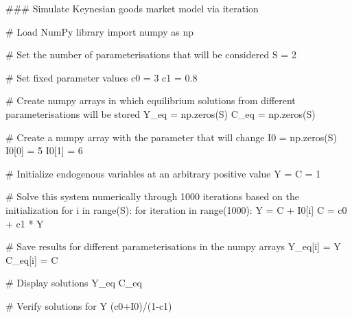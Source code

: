 \documentclass[
  letterpaper,
  DIV=11,
  numbers=noendperiod]{scrreprt}
\newenvironment{Shaded}{\begin{snugshade}}{\end{snugshade}}
\newcommand{\BuiltInTok}[1]{\textcolor[rgb]{0.00,0.23,0.31}{#1}}
\newcommand{\CommentTok}[1]{\textcolor[rgb]{0.37,0.37,0.37}{#1}}
\newcommand{\ControlFlowTok}[1]{\textcolor[rgb]{0.00,0.23,0.31}{#1}}
\newcommand{\DecValTok}[1]{\textcolor[rgb]{0.68,0.00,0.00}{#1}}
\newcommand{\FloatTok}[1]{\textcolor[rgb]{0.68,0.00,0.00}{#1}}
\newcommand{\ImportTok}[1]{\textcolor[rgb]{0.00,0.46,0.62}{#1}}
\newcommand{\KeywordTok}[1]{\textcolor[rgb]{0.00,0.23,0.31}{#1}}
\newcommand{\NormalTok}[1]{\textcolor[rgb]{0.00,0.23,0.31}{#1}}
\newcommand{\OperatorTok}[1]{\textcolor[rgb]{0.37,0.37,0.37}{#1}}
\begin{document}
\begin{tcolorbox}[enhanced jigsaw, titlerule=0mm, breakable, bottomrule=.15mm, toprule=.15mm, colbacktitle=quarto-callout-note-color!10!white, rightrule=.15mm, toptitle=1mm, opacityback=0, left=2mm, coltitle=black, title=\textcolor{quarto-callout-note-color}{\faInfo}\hspace{0.5em}{Python code}, colframe=quarto-callout-note-color-frame, opacitybacktitle=0.6, leftrule=.75mm, bottomtitle=1mm, arc=.35mm, colback=white]

\begin{Shaded}
\begin{Highlighting}[]
\CommentTok{\#\#\# Simulate Keynesian goods market model via iteration}

\CommentTok{\# Load NumPy library}
\ImportTok{import}\NormalTok{ numpy }\ImportTok{as}\NormalTok{ np}

\CommentTok{\# Set the number of parameterisations that will be considered}
\NormalTok{S }\OperatorTok{=} \DecValTok{2}

\CommentTok{\# Set fixed parameter values}
\NormalTok{c0 }\OperatorTok{=} \DecValTok{3}
\NormalTok{c1 }\OperatorTok{=} \FloatTok{0.8}

\CommentTok{\# Create numpy arrays in which equilibrium solutions from different parameterisations will be stored}
\NormalTok{Y\_eq }\OperatorTok{=}\NormalTok{ np.zeros(S)}
\NormalTok{C\_eq }\OperatorTok{=}\NormalTok{ np.zeros(S)}

\CommentTok{\# Create a numpy array with the parameter that will change}
\NormalTok{I0 }\OperatorTok{=}\NormalTok{ np.zeros(S)}
\NormalTok{I0[}\DecValTok{0}\NormalTok{] }\OperatorTok{=} \DecValTok{5}
\NormalTok{I0[}\DecValTok{1}\NormalTok{] }\OperatorTok{=} \DecValTok{6}

\CommentTok{\# Initialize endogenous variables at an arbitrary positive value}
\NormalTok{Y }\OperatorTok{=}\NormalTok{ C }\OperatorTok{=} \DecValTok{1}

\CommentTok{\# Solve this system numerically through 1000 iterations based on the initialization}
\ControlFlowTok{for}\NormalTok{ i }\KeywordTok{in} \BuiltInTok{range}\NormalTok{(S):}
    \ControlFlowTok{for}\NormalTok{ iteration }\KeywordTok{in} \BuiltInTok{range}\NormalTok{(}\DecValTok{1000}\NormalTok{):}
\NormalTok{        Y }\OperatorTok{=}\NormalTok{ C }\OperatorTok{+}\NormalTok{ I0[i]}
\NormalTok{        C }\OperatorTok{=}\NormalTok{ c0 }\OperatorTok{+}\NormalTok{ c1 }\OperatorTok{*}\NormalTok{ Y}

    \CommentTok{\# Save results for different parameterisations in the numpy arrays}
\NormalTok{    Y\_eq[i] }\OperatorTok{=}\NormalTok{ Y}
\NormalTok{    C\_eq[i] }\OperatorTok{=}\NormalTok{ C}

\CommentTok{\# Display solutions}
\NormalTok{Y\_eq}
\NormalTok{C\_eq}

\CommentTok{\# Verify solutions for Y}
\NormalTok{(c0}\OperatorTok{+}\NormalTok{I0)}\OperatorTok{/}\NormalTok{(}\DecValTok{1}\OperatorTok{{-}}\NormalTok{c1)}
\end{Highlighting}
\end{Shaded}

\end{tcolorbox}
\end{document}
